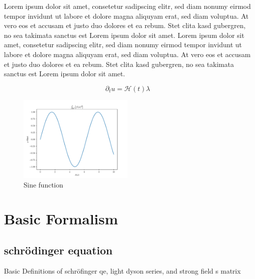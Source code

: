 Lorem ipsum dolor sit amet, consetetur sadipscing elitr, sed diam nonumy eirmod tempor invidunt ut labore et dolore magna aliquyam erat, sed diam voluptua. At vero eos et accusam et justo duo dolores et ea rebum. Stet clita kasd gubergren, no sea takimata sanctus est Lorem ipsum dolor sit amet. Lorem ipsum dolor sit amet, consetetur sadipscing elitr, sed diam nonumy eirmod tempor invidunt ut labore et dolore magna aliquyam erat, sed diam voluptua. At vero eos et accusam et justo duo dolores et ea rebum. Stet clita kasd gubergren, no sea takimata sanctus est Lorem ipsum dolor sit amet.

\begin{equation}
    \partial_t u = \mathcal{H}(t)  \lambda 
\end{equation}

\begin{figure}[H]
    \centering
    \includegraphics[width=0.5\textwidth]{figures/plot.pdf}
    \caption{Sine function}
    \label{fig:sinus}
\end{figure}




\newpage
\section{Basic Formalism}
\subsection{schrödinger equation}

Basic Definitions of schröfinger qe, light dyson series, and strong field s matrix

